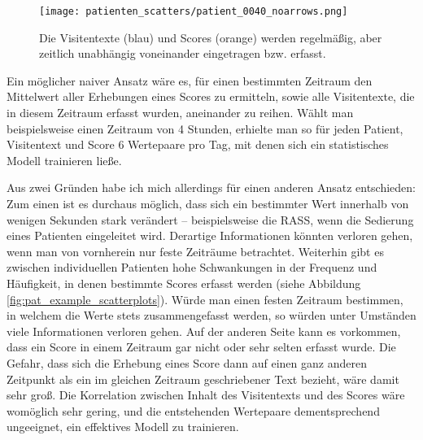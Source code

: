 \begin{figure}[htb]
    \captionsetup{justification=centering}
    \centering
    \texttt{[image: patienten\_scatters/patient\_0040\_noarrows.png]}
    \caption{Die Visitentexte (blau) und Scores (orange) werden regelmäßig, aber zeitlich unabhängig voneinander eingetragen bzw. erfasst.}
    \label{fig:pat40_scatter}
\end{figure}

Ein möglicher naiver Ansatz wäre es, für einen bestimmten Zeitraum den Mittelwert aller Erhebungen eines Scores zu ermitteln, sowie alle Visitentexte, die in diesem Zeitraum erfasst wurden, aneinander zu reihen. Wählt man beispielsweise einen Zeitraum von 4 Stunden, erhielte man so für jeden Patient, Visitentext und Score 6 Wertepaare pro Tag, mit denen sich ein statistisches Modell trainieren ließe.

Aus zwei Gründen habe ich mich allerdings für einen anderen Ansatz entschieden: Zum einen ist es durchaus möglich, dass sich ein bestimmter Wert innerhalb von wenigen Sekunden stark verändert -- beispielsweise die RASS, wenn die Sedierung eines Patienten eingeleitet wird. Derartige Informationen könnten verloren gehen, wenn man von vornherein nur feste Zeiträume betrachtet. Weiterhin gibt es zwischen individuellen Patienten hohe Schwankungen in der Frequenz und Häufigkeit, in denen bestimmte Scores erfasst werden (siehe Abbildung \ref{fig:pat_example_scatterplots}). Würde man einen festen Zeitraum bestimmen, in welchem die Werte stets zusammengefasst werden, so würden unter Umständen viele Informationen verloren gehen. Auf der anderen Seite kann es vorkommen, dass ein Score in einem Zeitraum gar nicht oder sehr selten erfasst wurde. Die Gefahr, dass sich die Erhebung eines Score dann auf einen ganz anderen Zeitpunkt als ein im gleichen Zeitraum geschriebener Text bezieht, wäre damit sehr groß. Die Korrelation zwischen Inhalt des Visitentexts und des Scores wäre womöglich sehr gering, und die entstehenden Wertepaare dementsprechend ungeeignet, ein effektives Modell zu trainieren.

